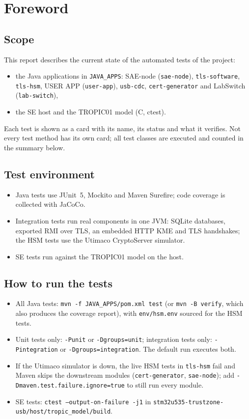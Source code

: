 \documentclass[11pt,a4paper]{report}
\begin{document}
\tableofcontents
\clearpage

\chapter*{Foreword}

\section*{Scope}
This report describes the current state of the automated tests of the project:
\begin{itemize}
  \item the Java applications in \texttt{JAVA\_APPS}: SAE-node (\texttt{sae-node}), \texttt{tls-software}, \texttt{tls-hsm}, USER APP (\texttt{user-app}), \texttt{usb-cdc}, \texttt{cert-generator} and LabSwitch (\texttt{lab-switch}),
  \item the SE host and the TROPIC01 model (C, ctest).
\end{itemize}
Each test is shown as a card with its name, its status and what it verifies. Not every test method has its own card; all test classes are executed and counted in the summary below.

\section*{Test environment}
\begin{itemize}
  \item Java tests use JUnit~5, Mockito and Maven Surefire; code coverage is collected with JaCoCo.
  \item Integration tests run real components in one JVM: SQLite databases, exported RMI over TLS, an embedded HTTP KME and TLS handshakes; the HSM tests use the Utimaco CryptoServer simulator.
  \item SE tests run against the TROPIC01 model on the host.
\end{itemize}

\section*{How to run the tests}
\begin{itemize}
  \item All Java tests: \texttt{mvn -f JAVA\_APPS/pom.xml test} (or \texttt{mvn -B verify}, which also produces the coverage report), with \texttt{env/hsm.env} sourced for the HSM tests.
  \item Unit tests only: \texttt{-Punit} or \texttt{-Dgroups=unit}; integration tests only: \texttt{-Pintegration} or \texttt{-Dgroups=integration}. The default run executes both.
  \item If the Utimaco simulator is down, the live HSM tests in \texttt{tls-hsm} fail and Maven skips the downstream modules (\texttt{cert-generator}, \texttt{sae-node}); add \texttt{-Dmaven.test.failure.ignore=true} to still run every module.
  \item SE tests: \texttt{ctest --output-on-failure -j1} in \texttt{stm32u535-trustzone-usb/host/tropic\_model/build}.
\end{itemize}
\end{document}
